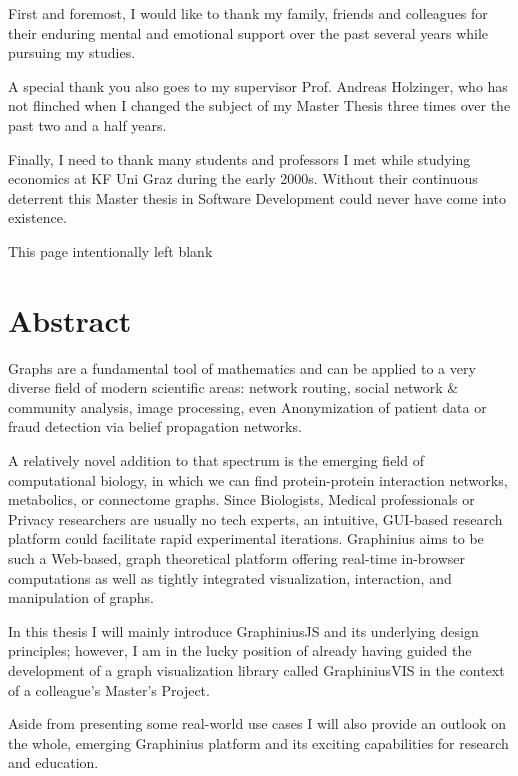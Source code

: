 {First and foremost, I would like to thank my family, friends and colleagues for their enduring mental and emotional support over the past several years while pursuing my studies.

A special thank you also goes to my supervisor Prof. Andreas Holzinger, who has not flinched when I changed the subject of my Master Thesis three times over the past two and a half years.

Finally, I need to thank many students and professors I met while studying economics at KF Uni Graz during the early 2000s. Without their continuous deterrent this Master thesis in Software Development could never have come into existence.


\clearpage
\begin{center}
This page intentionally left blank
\end{center}
\clearpage

\section*{Abstract}

Graphs are a fundamental tool of mathematics and can be applied to a very diverse field of modern scientific areas: network routing, social network \& community analysis, image processing, even Anonymization of patient data or fraud detection via belief propagation networks.

A relatively novel addition to that spectrum is the emerging field of computational biology, in which we can find protein-protein interaction networks, metabolics, or connectome graphs. Since Biologists, Medical professionals or Privacy researchers are usually no tech experts, an intuitive, GUI-based research platform could facilitate rapid experimental iterations. Graphinius aims to be such a Web-based, graph theoretical platform offering real-time in-browser computations as well as tightly integrated visualization, interaction, and manipulation of graphs.

In this thesis I will mainly introduce GraphiniusJS and its underlying design principles; however, I am in the lucky position of already having guided the development of a graph visualization library called GraphiniusVIS in the context of a colleague's Master's Project.

Aside from presenting some real-world use cases I will also provide an outlook on the whole, emerging Graphinius platform and its exciting capabilities for research and education.


}

